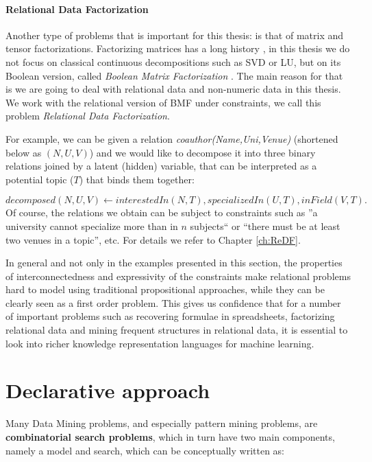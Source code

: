 \paragraph{Relational Data Factorization}\label{sec:intro_redf}
Another type of problems that is important for this thesis: is that of
matrix and tensor factorizations. Factorizing matrices has a long
history \parencite{matrix_book}, in this thesis we do not focus on
classical continuous decompositions such as SVD or LU, but on its
Boolean version, called \textit{Boolean Matrix
Factorization} \parencite{phd_miettinen}. The main reason for that is
we are going to deal with relational data and non-numeric data in this
thesis. We work with the relational version of BMF under constraints,
we call this problem \textit{Relational Data Factorization}.

For example, we can be given a relation
\textit{coauthor(Name,Uni,Venue)} (shortened below as $(N,U,V)$) and we would like to decompose it
into three binary relations joined by a latent (hidden) variable, that
can be interpreted as a potential topic ($T$) that binds them together:

\begin{equation*}
\textit{decomposed}(N,U,V) \leftarrow \textit{interestedIn}(N, \textit{T}), \textit{specializedIn}(U, \textit{T}), \textit{inField}(V, \textit{T}).
\end{equation*}
Of course, the relations we obtain can be subject to constraints such
as ''a university cannot specialize more than in $n$ subjects`` or ``there
must be at least two venues in a topic'', etc. For details we refer to
Chapter \ref{ch:ReDF}.


In general and not only in the examples presented in this section, the
properties of interconnectedness and expressivity of the constraints
make relational problems hard to model using traditional propositional
approaches, while they can be clearly seen as a first order problem. This gives us confidence that for a number of important problems such as recovering formulae in spreadsheets, factorizing relational data and mining frequent structures in relational data, it is essential to look into richer knowledge representation languages for machine learning.

\section{Declarative approach}\label{sec:declarative_intro}
Many Data Mining problems, and especially pattern mining
problems, are \textbf{combinatorial search problems}, which in turn
have two main components, namely a model and search, which can be
conceptually written as:

